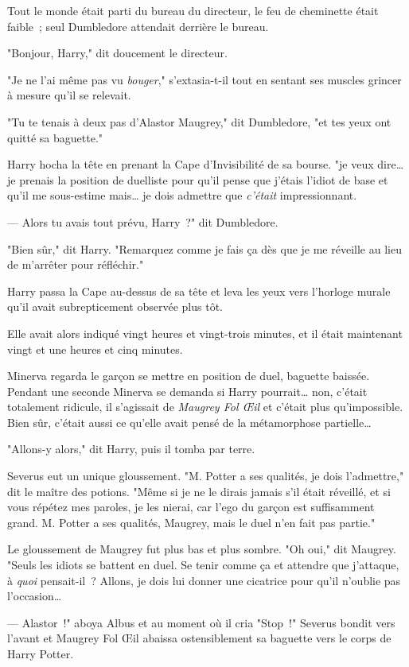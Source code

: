 Tout le monde était parti du bureau du directeur, le feu de cheminette était faible~; seul Dumbledore attendait derrière le bureau.

"Bonjour, Harry," dit doucement le directeur.

"Je ne l'ai même pas vu \emph{bouger}," s'extasia-t-il tout en sentant ses muscles grincer à mesure qu'il se relevait.

"Tu te tenais à deux pas d'Alastor Maugrey," dit Dumbledore, "et tes yeux ont quitté sa baguette."

Harry hocha la tête en prenant la Cape d'Invisibilité de sa bourse. "je veux dire… je prenais la position de duelliste pour qu'il pense que j'étais l'idiot de base et qu'il me sous-estime mais… je dois admettre que \emph{c'était} impressionnant.

--- Alors tu avais tout prévu, Harry~?" dit Dumbledore.

"Bien sûr," dit Harry. "Remarquez comme je fais ça dès que je me réveille au lieu de m'arrêter pour réfléchir."

Harry passa la Cape au-dessus de sa tête et leva les yeux vers l'horloge murale qu'il avait subrepticement observée plus tôt.

Elle avait alors indiqué vingt heures et vingt-trois minutes, et il était maintenant vingt et une heures et cinq minutes.

\later

Minerva regarda le garçon se mettre en position de duel, baguette baissée. Pendant une seconde Minerva se demanda si Harry pourrait… non, c'était totalement ridicule, il s'agissait de \emph{Maugrey Fol Œil} et c'était plus qu'impossible. Bien sûr, c'était aussi ce qu'elle avait pensé de la métamorphose partielle…

"Allons-y alors," dit Harry, puis il tomba par terre.

Severus eut un unique gloussement. "M. Potter a ses qualités, je dois l'admettre," dit le maître des potions. "Même si je ne le dirais jamais s'il était réveillé, et si vous répétez mes paroles, je les nierai, car l'ego du garçon est suffisamment grand. M. Potter a ses qualités, Maugrey, mais le duel n'en fait pas partie."

Le gloussement de Maugrey fut plus bas et plus sombre. "Oh oui," dit Maugrey. "Seuls les idiots se battent en duel. Se tenir comme ça et attendre que j'attaque, à \emph{quoi} pensait-il~? Allons, je dois lui donner une cicatrice pour qu'il n'oublie pas l'occasion…

--- Alastor~!" aboya Albus et au moment où il cria "Stop~!" Severus bondit vers l'avant et Maugrey Fol Œil abaissa ostensiblement sa baguette vers le corps de Harry Potter.

